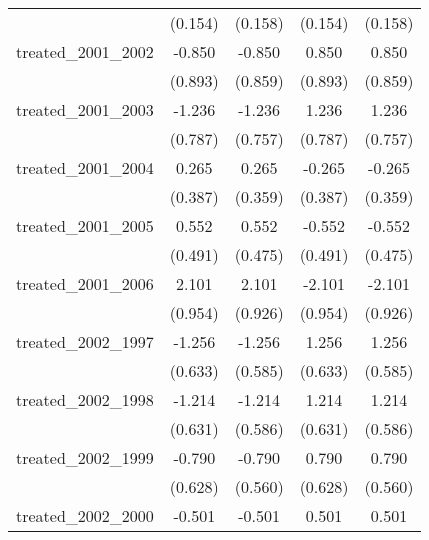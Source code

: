 {\begin{tabular}{l*{4}{c}}
            &     (0.154)         &     (0.158)         &     (0.154)         &     (0.158)         \\
[1em]
treated\_2001\_2002&      -0.850         &      -0.850         &       0.850         &       0.850         \\
            &     (0.893)         &     (0.859)         &     (0.893)         &     (0.859)         \\
[1em]
treated\_2001\_2003&      -1.236         &      -1.236         &       1.236         &       1.236         \\
            &     (0.787)         &     (0.757)         &     (0.787)         &     (0.757)         \\
[1em]
treated\_2001\_2004&       0.265         &       0.265         &      -0.265         &      -0.265         \\
            &     (0.387)         &     (0.359)         &     (0.387)         &     (0.359)         \\
[1em]
treated\_2001\_2005&       0.552         &       0.552         &      -0.552         &      -0.552         \\
            &     (0.491)         &     (0.475)         &     (0.491)         &     (0.475)         \\
[1em]
treated\_2001\_2006&       2.101\sym{*}  &       2.101\sym{*}  &      -2.101\sym{*}  &      -2.101\sym{*}  \\
            &     (0.954)         &     (0.926)         &     (0.954)         &     (0.926)         \\
[1em]
treated\_2002\_1997&      -1.256\sym{*}  &      -1.256\sym{*}  &       1.256\sym{*}  &       1.256\sym{*}  \\
            &     (0.633)         &     (0.585)         &     (0.633)         &     (0.585)         \\
[1em]
treated\_2002\_1998&      -1.214         &      -1.214\sym{*}  &       1.214         &       1.214\sym{*}  \\
            &     (0.631)         &     (0.586)         &     (0.631)         &     (0.586)         \\
[1em]
treated\_2002\_1999&      -0.790         &      -0.790         &       0.790         &       0.790         \\
            &     (0.628)         &     (0.560)         &     (0.628)         &     (0.560)         \\
[1em]
treated\_2002\_2000&      -0.501         &      -0.501         &       0.501         &       0.501         \\

\end{tabular}}

